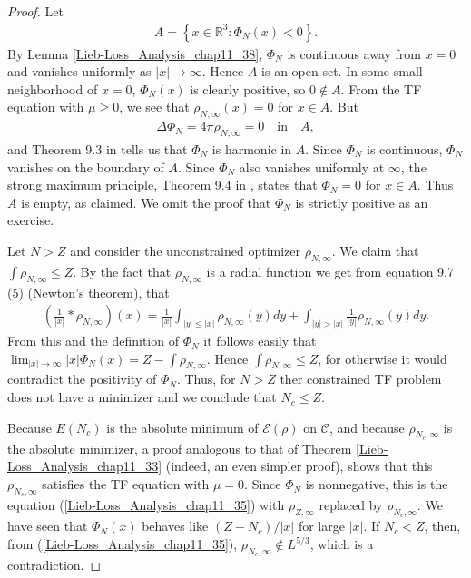 \documentclass[openany, a4paper, oneside]{book}
\theoremstyle{break}
\theoremstyle{breakdefn}
\newcommand{\abs}[1]{\left|#1\right|}
\newcommand{\rbk}[1]{\left (#1\right)}
\newcommand{\set}[2]{\left\{#1 : #2\right\}}
\newcommand{\bbRthree}{\mathbb{R}^3}
\newcommand{\calC}{\mathcal{C}}
\newcommand{\calE}{\mathcal{E}}
\newcommand{\rhoNinfty}{\rho_{N, \infty}}
\begin{document}
\begin{proof}
Let
\begin{align}
 A
 =
 \set{x \in \bbRthree}{\Phi_N (x) < 0}.
\end{align}
By Lemma \ref{Lieb-Loss_Analysis_chap11_38},
$\Phi_N$ is continuous away from $x=0$ and vanishes uniformly as $\abs{x} \to \infty$.
Hence $A$ is an open set.
In some small neighborhood of $x=0$, $\Phi_N (x)$ is clearly positive, so $0 \notin A$.
From the TF equation with $\mu \geq 0$,
we see that $\rhoNinfty (x) = 0$ for $x \in A$.
But
\begin{align}
 \Delta \Phi_N = 4 \pi \rhoNinfty = 0 \quad \text{in}  \quad A,
\end{align}
and Theorem 9.3 in \cite{LiebLoss1} tells us that $\Phi_N$ is harmonic in $A$.
Since $\Phi_N$ is continuous, $\Phi_N$ vanishes on the boundary of $A$.
Since $\Phi_N$ also vanishes uniformly at $\infty$, the strong maximum principle, Theorem 9.4 in \cite{LiebLoss1},
states that $\Phi_N = 0$ for $x \in A$.
Thus $A$ is empty, as claimed.
We omit the proof that $\Phi_N$ is strictly positive as an exercise.

Let $N > Z$ and consider the unconstrained optimizer $\rhoNinfty$.
We claim that $\int \rhoNinfty \leq Z$.
By the fact that $\rhoNinfty$ is a radial function we get from equation 9.7 (5) \cite{LiebLoss1} (Newton's theorem),
that
\begin{align}
 \rbk{\frac{1}{\abs{x}} * \rhoNinfty} (x)
 =
 \frac{1}{\abs{x}} \int_{\abs{y} \leq \abs{x}} \rhoNinfty (y) dy
  +\int_{\abs{y} > \abs{x}} \frac{1}{\abs{y}} \rhoNinfty (y) dy.
\end{align}
From this and the definition of $\Phi_N$ it follows easily that $\lim_{\abs{x} \to \infty} \abs{x} \Phi_N (x) = Z - \int \rhoNinfty$.
Hence $\int \rhoNinfty \leq Z$, for otherwise it would contradict the positivity of $\Phi_N$.
Thus, for $N > Z$ ther constrained TF problem does not have a minimizer and we conclude that $N_c \leq Z$.

Because $E (N_c)$ is the absolute minimum of $\calE (\rho)$ on $\calC$,
and because $\rho_{N_c, \infty}$ is the absolute minimizer, a proof analogous to that of Theorem \ref{Lieb-Loss_Analysis_chap11_33}
(indeed, an even simpler proof), shows that this $\rho_{N_c, \infty}$ satisfies the TF equation with $\mu = 0$.
Since $\Phi_N$ is nonnegative, this is the equation (\ref{Lieb-Loss_Analysis_chap11_35}) with $\rho_{Z, \infty}$ replaced by $\rho_{N_c, \infty}$.
We have seen that $\Phi_N (x)$ behaves like $(Z - N_c)/ \abs{x}$ for large $\abs{x}$.
If $N_c < Z$, then, from (\ref{Lieb-Loss_Analysis_chap11_35}), $\rho_{N_c, \infty} \notin L^{5/3}$, which is a contradiction.
\end{proof}
\end{document}
